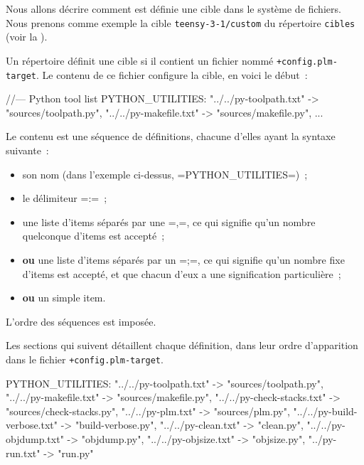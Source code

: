 Nous allons décrire comment est définie une cible dans le système de fichiers. Nous prenons comme exemple la cible \texttt{teensy-3-1/custom} du répertoire \texttt{cibles} (voir la ).

Un répertoire définit une cible si il contient un fichier nommé \texttt{+config.plm-target}. Le contenu de ce fichier configure la cible, en voici le début~:

\begin{PLM}
//--- Python tool list
PYTHON_UTILITIES:
   "../../py-toolpath.txt" -> "sources/toolpath.py",
   "../../py-makefile.txt" -> "sources/makefile.py",
   ...
\end{PLM}


Le contenu est une séquence de définitions, chacune d'elles ayant la syntaxe suivante~:
\begin{itemize}
  \item son nom (dans l'exemple ci-dessus, \plm=PYTHON_UTILITIES=)~;
  \item le délimiteur \plm=:=~;
  \item une liste d'items séparés par une \plm=,=, ce qui signifie qu'un nombre quelconque d'items est accepté~;
  \item {\bf ou} une liste d'items séparés par un \plm=;=, ce qui signifie qu'un nombre fixe d'items est accepté, et que chacun d'eux a une signification particulière~;
  \item {\bf ou} un simple item.
\end{itemize}

L'ordre des séquences est imposée.

Les sections qui suivent détaillent chaque définition, dans leur ordre d'apparition dans le fichier \texttt{+config.plm-target}.











\begin{PLM}
PYTHON_UTILITIES:
   "../../py-toolpath.txt" -> "sources/toolpath.py",
   "../../py-makefile.txt" -> "sources/makefile.py",
   "../../py-check-stacks.txt" -> "sources/check-stacks.py",
   "../../py-plm.txt" -> "sources/plm.py",
   "../../py-build-verbose.txt" -> "build-verbose.py",
   "../../py-clean.txt" -> "clean.py",
   "../../py-objdump.txt" -> "objdump.py",
   "../../py-objsize.txt" -> "objsize.py",
   "../py-run.txt" -> "run.py"
\end{PLM}

